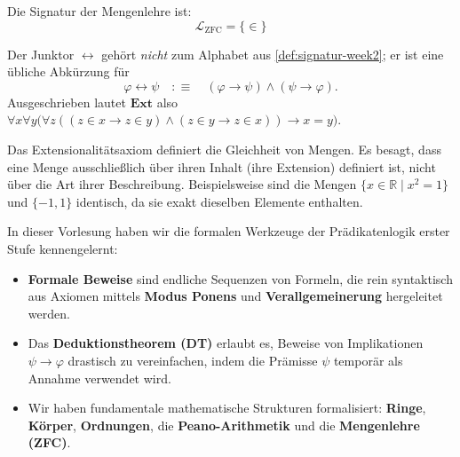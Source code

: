 \begin{math-stroke}
Die Signatur der Mengenlehre ist:
\[ \mathcal{L}_{\text{ZFC}} = \{\in\} \]


\begin{explanation-of-steps}
Der Junktor $\leftrightarrow$ gehört \emph{nicht} zum Alphabet aus \cref{def:signatur-week2}; er ist eine übliche Abkürzung für
\[ \varphi \leftrightarrow \psi \quad :\equiv \quad (\varphi \rightarrow \psi) \wedge (\psi \rightarrow \varphi). \]
Ausgeschrieben lautet $\mathbf{Ext}$ also $\forall x \forall y \bigl(\forall z ((z \in x \rightarrow z \in y) \wedge (z \in y \rightarrow z \in x)) \rightarrow x = y\bigr)$.
\end{explanation-of-steps}

\begin{explanation-of-steps}
Das Extensionalitätsaxiom definiert die Gleichheit von Mengen. Es besagt, dass eine Menge ausschließlich über ihren Inhalt (ihre Extension) definiert ist, nicht über die Art ihrer Beschreibung. Beispielsweise sind die Mengen $\{x \in \mathbb{R} \mid x^2 = 1\}$ und $\{-1, 1\}$ identisch, da sie exakt dieselben Elemente enthalten.
\end{explanation-of-steps}
\end{math-stroke}

\begin{nice-box}
In dieser Vorlesung haben wir die formalen Werkzeuge der Prädikatenlogik erster Stufe kennengelernt:
\begin{itemize}
    \item \textbf{Formale Beweise} sind endliche Sequenzen von Formeln, die rein syntaktisch aus Axiomen mittels \textbf{Modus Ponens} und \textbf{Verallgemeinerung} hergeleitet werden.
    \item Das \textbf{Deduktionstheorem (DT)} erlaubt es, Beweise von Implikationen $\psi \rightarrow \varphi$ drastisch zu vereinfachen, indem die Prämisse $\psi$ temporär als Annahme verwendet wird.
    \item Wir haben fundamentale mathematische Strukturen formalisiert: \textbf{Ringe}, \textbf{Körper}, \textbf{Ordnungen}, die \textbf{Peano-Arithmetik} und die \textbf{Mengenlehre (ZFC)}.
\end{itemize}
\end{nice-box}
